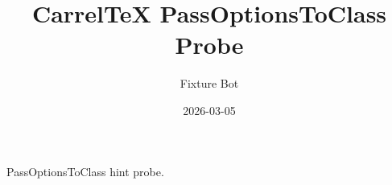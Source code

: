\documentclass{memoir}
\title{CarrelTeX PassOptionsToClass Probe}
\author{Fixture Bot}
\date{2026-03-05}
\begin{document}
\maketitle

PassOptionsToClass hint probe.
\end{document}
